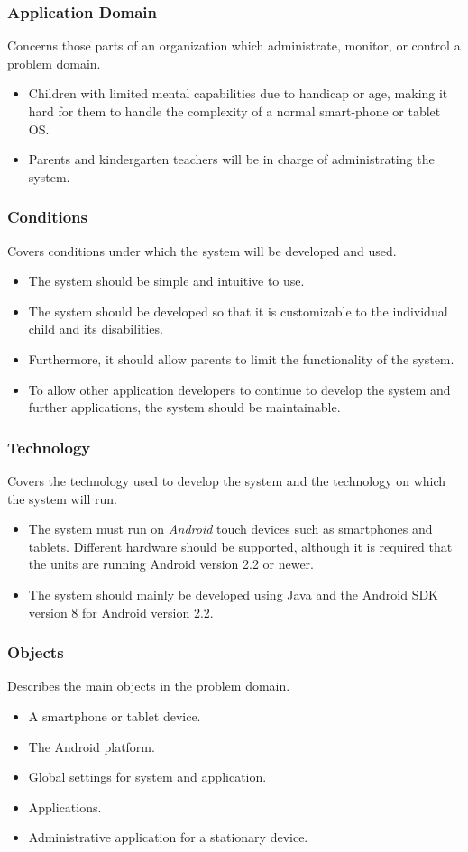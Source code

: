 \subsubsection{Application Domain} 
Concerns those parts of an organization which administrate, monitor, or control a
problem domain.
\begin{itemize}
	\item Children with limited mental capabilities due to handicap or age, making it hard for them to handle the complexity of a normal smart-phone or tablet OS. 
	\item Parents and kindergarten teachers will be in charge of administrating the system.
\end{itemize}

\subsubsection{Conditions} 
Covers conditions under which the system will be developed and used.
\begin{itemize}
	\item The system should be simple and intuitive to use. 
	\item The system should be developed so that it is customizable to the individual child and its disabilities.
	\item Furthermore, it should allow parents to limit the functionality of the system. 
	\item To allow other application developers to continue to develop the system and further applications, the system should be maintainable.
\end{itemize}

\subsubsection{Technology} 
Covers the technology used to develop the system and the technology on which the system will run.
\begin{itemize}
	\item The system must run on \emph{Android} touch devices such as smartphones and tablets. Different hardware should be supported, although it is required that the units are running Android version 2.2 or newer. 
	\item The system should mainly be developed using Java and the Android SDK version 8 for Android version 2.2.
\end{itemize}

\subsubsection{Objects} 
Describes the main objects in the problem domain.
\begin{itemize}
	\item A smartphone or tablet device. 
	\item The Android platform. 
	\item Global settings for system and application.
	\item Applications.
	\item Administrative application for a stationary device.
\end{itemize}

